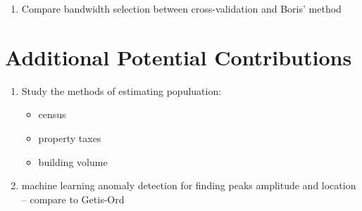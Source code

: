 \begin{singlespace*}
\begin{enumerate}
\item Compare bandwidth selection between cross-validation and Boris' method
\end{enumerate}

\section{Additional Potential Contributions}

\begin{enumerate}
\item Study the methods of estimating populuation:
    \begin{itemize}
    \item census
    \item property taxes
    \item building volume
    \end{itemize}
\item machine learning anomaly detection for finding peaks amplitude and location -- compare to Getis-Ord
\end{enumerate}

\end{singlespace*}
